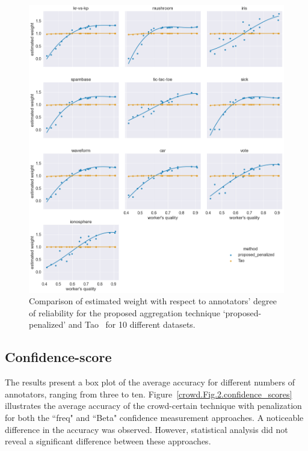 \documentclass[pdflatex,bst/sn-basic]{bst/sn-jnl}%
\begin{document}
\begin{figure}[!htbp]
    \label{crowd.Fig.1.weight}
    \centering
    \includegraphics[width=\textwidth]{figures/image1.png}
    \caption{{Comparison of estimated weight with respect to annotators' degree of reliability for the proposed aggregation technique `proposed-penalized' and Tao\unskip~\protect\cite{tao_Label_2020} \cite{tao_Label_2020} for 10 different datasets.}}
\end{figure}

\subsection{Confidence-score}

The results present a box plot of the average accuracy for different numbers of annotators, ranging from three to ten.
Figure~\ref{crowd.Fig.2.confidence_scores} illustrates the average accuracy of the crowd-certain technique with penalization for both the ``freq" and ``Beta" confidence measurement approaches. A noticeable difference in the accuracy was observed. However, statistical analysis did not reveal a significant difference between these approaches.
\end{document}
